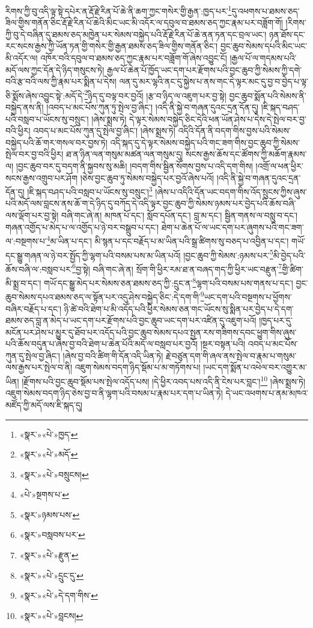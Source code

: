 རིགས་ཀྱི་བུ་འདི་ལྟ་སྟེ་དཔེར་ན་རྡོ་རྗེ་རིན་པོ་ཆེ་ནི་ཆག་ཀྱང་གསེར་གྱི་རྒྱན་:ཁྱད་པར་\footnote{«སྣར་»«པེ་»ཁྱད་}དུ་འཕགས་པ་ཐམས་ཅད་ཟིལ་གྱིས་གནོན་ཅིང་རྡོ་རྗེ་རིན་པོ་ཆེའི་མིང་ཡང་མི་འདོར་ལ་དབུལ་བ་ཐམས་ཅད་ཀྱང་རྣམ་པར་བཟློག་གོ། །རིགས་ཀྱི་བུ་དེ་བཞིན་དུ་ཐམས་ཅད་མཁྱེན་པར་སེམས་བསྐྱེད་པའི་རྡོ་རྗེ་རིན་པོ་ཆེ་ནན་ཏན་དང་བྲལ་ཡང་། ཉན་ཐོས་དང་རང་སངས་རྒྱས་ཀྱི་ཡོན་ཏན་གྱི་གསེར་གྱི་རྒྱན་ཐམས་ཅད་ཟིལ་གྱིས་གནོན་ཅིང་། བྱང་ཆུབ་སེམས་དཔའི་མིང་ཡང་མི་འདོར་ལ། འཁོར་བའི་དབུལ་བ་ཐམས་ཅད་ཀྱང་རྣམ་པར་བཟློག་གོ་ཞེས་འབྱུང་ངོ། །རྒྱལ་པོ་ལ་གདམས་པའི་མདོ་ལས་ཀྱང་དོན་དེ་ཉིད་གསུངས་ཏེ། རྒྱལ་པོ་ཆེན་པོ་ཁྱོད་ཡང་དག་པར་རྫོགས་པའི་བྱང་ཆུབ་ཀྱི་སེམས་ཀྱི་དགེ་བའི་རྩ་བའི་ལས་ཀྱི་རྣམ་པར་སྨིན་པ་དེས། ལན་དུ་མར་ལྷའི་ནང་དུ་སྐྱེས་པ་ནས་གང་དེ་ལྟར་མང་དུ་བྱ་བ་བྱེད་པ་ལྟ་ཅི་སྨོས་ཞེས་འབྱུང་སྟེ་:མདོ་དེ་\footnote{«སྣར་»«པེ་»མདོ་}ཉིད་དུ་བལྟ་བར་བྱའོ། །རྩ་བ་ཉིད་ལ་འཇུག་པར་བྱ་སྟེ། བྱང་ཆུབ་སྨོན་པའི་སེམས་ནི་བསྐྱེད་ནས་ནི། །འབད་པ་མང་པོས་ཀུན་ཏུ་སྤེལ་བྱ་ཞིང་། །འདི་ནི་སྐྱེ་བ་གཞན་དུའང་དྲན་དོན་དུ། །ཇི་སྐད་བཤད་པའི་བསླབ་པ་ཡོངས་སུ་བསྲུང་། །ཞེས་སྨྲས་ཏེ། དེ་ལྟར་སེམས་བསྐྱེད་ཅིང་དེའི་ཕན་ཡོན་ཤེས་པ་དེས་དེ་སྤེལ་བར་བྱ་བའི་ཕྱིར། འབད་པ་མང་པོས་ཀུན་དུ་སྤེལ་བྱ་ཞིང་། །ཞེས་སྨྲས་ཏེ། འདིའི་དོན་ནི་བདག་གིས་བྱས་པའི་སེམས་བསྐྱེད་པའི་ཆོ་གར་གསལ་བར་བྱས་ཏེ། འདི་སྐད་དུ་དེ་ལྟར་སེམས་བསྐྱེད་པའི་གང་ཟག་གིས་བྱང་ཆུབ་ཀྱི་སེམས་སྤེལ་བར་བྱ་བའི་ཕྱིར། ཐ་ན་ཉིན་ལན་གསུམ་མཚན་ལན་གསུམ་དུ། སངས་རྒྱས་ཆོས་དང་ཚོགས་ཀྱི་མཆོག་རྣམས་ལ། །བྱང་ཆུབ་བར་དུ་བདག་ནི་སྐྱབས་སུ་མཆི། །བདག་གིས་སྦྱིན་སོགས་བྱས་པ་འདི་དག་གིས། །འགྲོ་ལ་ཕན་ཕྱིར་སངས་རྒྱས་འགྲུབ་པར་ཤོག །ཅེས་བྱང་ཆུབ་ཏུ་སེམས་བསྐྱེད་པར་བྱའོ་ཞེས་པའོ། །འདི་ནི་སྐྱེ་བ་གཞན་དུའང་དྲན་དོན་དུ། །ཇི་སྐད་བཤད་པའི་བསླབ་པ་ཡོངས་སུ་བསྲུང་།\footnote{«སྣར་»«པེ་»བསྲུངས།} །ཞེས་པ་འདིའི་དོན་ཡང་བདག་གིས་འོད་སྲུངས་ཀྱིས་ཞུས་པའི་མདོ་ལས་བླངས་ནས་ཆོ་ག་དེ་ཉིད་དུ་བཀོད་དེ་འདི་ལྟར་བྱང་ཆུབ་ཀྱི་སེམས་ཉམས་པར་བྱེད་པའི་ཆོས་བཞི་ལས་ལྡོག་པར་བྱ་སྟེ། བཞི་གང་ཞེ་ན། མཁན་པོ་དང་། སློབ་དཔོན་དང་། བླ་མ་དང་། སྦྱིན་གནས་ལ་བསླུ་བ་དང་། གཞན་འགྱོད་པ་མེད་པ་ལ་འགྱོད་པ་ཉེ་བར་བསྒྲུབ་པ་དང་། ཐེག་པ་ཆེན་པོ་ལ་ཡང་དག་པར་ཞུགས་པའི་གང་ཟག་ལ་:བསྔགས་པ་\footnote{«པེ་»སྔགས་པ་}མ་ཡིན་པ་དང་། མི་སྙན་པ་དང་བརྗོད་པ་མ་ཡིན་པའི་སྒྲ་ཚིགས་སུ་བཅད་པ་འབྱིན་པ་དང་། གཡོ་དང་སྒྱུ་གཞན་ལ་ཉེ་བར་སྤྱོད་ཀྱི་ལྷག་པའི་བསམ་པས་མ་ཡིན་པའོ། །བྱང་ཆུབ་ཀྱི་སེམས་:ཉམས་པར་\footnote{«སྣར་»ཉམས་པས་}མི་བྱེད་པའི་ཆོས་བཞི་ལ་:བསླབ་པར་\footnote{«སྣར་»བསླབས་པར་}བྱ་སྟེ། བཞི་གང་ཞེ་ན། སྲོག་གི་ཕྱིར་རམ་ཐ་ན་བཞད་གད་ཀྱི་ཕྱིར་ཡང་བརྫུན་\footnote{«སྣར་»«པེ་»རྫུན་}གྱི་ཚིག་མི་སྨྲ་བ་དང་། གཡོ་དང་སྒྱུ་མེད་པར་སེམས་ཅན་ཐམས་ཅད་ཀྱི་:དྲུང་ན་\footnote{«སྣར་»«པེ་»དྲུང་དུ་}ལྷག་པའི་བསམ་པས་གནས་པ་དང་། བྱང་ཆུབ་སེམས་དཔའ་ཐམས་ཅད་ལ་སྟོན་པར་འདུ་ཤེས་བསྐྱེད་ཅིང་:དེ་དག་གི་\footnote{«སྣར་»«པེ་»དེ་དག་གིས་}ཡང་དག་པའི་བསྔགས་པ་ཕྱོགས་བཞིར་བརྗོད་པ་དང་། ཉི་ཚེ་བའི་ཐེག་པ་མི་འདོད་པའི་ཕྱིར་སེམས་ཅན་གང་ཡོངས་སུ་སྨིན་པར་བྱེད་པ་དེ་དག་ཐམས་ཅད་བླ་ན་མེད་པ་ཡང་དག་པར་རྫོགས་པའི་བྱང་ཆུབ་ཡང་དག་པར་འཛིན་དུ་འཇུག་པའོ། །ཁྱད་པར་དུ་མངོན་པར་ཤེས་པ་མྱུར་དུ་ཐོབ་པར་འདོད་པའི་བྱང་ཆུབ་སེམས་དཔའ་སྤྱན་རས་གཟིགས་དབང་ཕྱུག་གིས་ཞུས་པའི་ཆོས་བདུན་པ་ཞེས་བྱ་བའི་ཐེག་པ་ཆེན་པོའི་མདོ་ལ་བསླབ་པར་བྱའོ། །སྔར་བསྟན་པའི། འབད་པ་མང་པོས་ཀུན་དུ་སྤེལ་བྱ་ཞིང་། །ཞེས་བྱ་བའི་ཚིག་གི་དོན་འདི་ཡིན་ཏེ། རྗེ་བཙུན་དག་གི་ཞལ་ནས་སྤེལ་བ་རྣམ་པ་གསུམ་ལས་རྒྱས་པར་སྤེལ་བ་ནི། འཇུག་སེམས་བདག་ཉིད་སྡོམ་པ་མ་གཏོགས་པ། །ཡང་དག་སྨོན་པ་འཕེལ་བར་འགྱུར་མ་ཡིན། །རྫོགས་པའི་བྱང་ཆུབ་སྡོམ་པས་སྤེལ་འདོད་པས། །དེ་ཕྱིར་འབད་པས་འདི་ནི་ངེས་པར་བླང་།\footnote{«སྣར་»«པེ་»བླངས།} །ཞེས་སྨྲས་ཏེ། འཇུག་སེམས་བདག་ཉིད་ཅེས་བྱ་བ་ནི་ལྷག་པའི་བསམ་པ་རྣམ་པར་དག་པ་ཡིན་ཏེ། དེ་ཡང་འཕགས་པ་ནམ་མཁའ་མཛོད་ཀྱི་མདོ་ལས་ཇི་སྐད་དུ། 